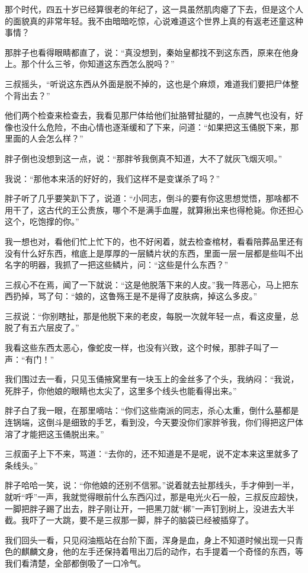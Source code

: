 那个时代，四五十岁已经算很老的年纪了，这一具虽然肌肉瘪了下去，但是这个人的面貌真的非常年轻。我不由暗暗吃惊，心说难道这个世界上真的有返老还童这种事情？

那胖子也看得眼睛都直了，说：“真没想到，秦始皇都找不到这东西，原来在他身上。那个什么三爷，你知道这东西怎么脱吗？”

三叔摇头，“听说这东西从外面是脱不掉的，这也是个麻烦，难道我们要把尸体整个背出去？”

他们两个检查来检查去，我看见那尸体给他们扯胳臂扯腿的，一点脾气也没有，好像也没什么危险，不由心情也逐渐缓和了下来，问道：“如果把这玉俑脱下来，那里面的人会怎么样？”

胖子倒也没想到这一点，说：“那胖爷我倒真不知道，大不了就灰飞烟灭呗。”

我说：“那他本来活的好好的，我们这样不是变谋杀了吗？”

胖子听了几乎要笑趴下了，说道：“小同志，倒斗的要有你这思想觉悟，那啥都不用干了，这古代的王公贵族，哪个不是满手血腥，就算揪出来也得枪毙。你还担心这个，吃饱撑的你。”

我一想也对，看他们忙上忙下的，也不好闲着，就去检查棺材，看看陪葬品里还有没有什么好东西，棺底上是厚厚的一层鳞片状的东西，里面一层一层都是些叫不出名字的明器，我抓了一把这些鳞片，问：“这些是什么东西？”

三叔心不在焉，闻了一下就说：“这是他脱落下来的人皮。”我一阵恶心，马上把东西扔掉，骂了句：“娘的，这鲁殇王是不是得了皮肤病，掉这么多皮。”

三叔说：“你别瞎扯，那是他脱下来的老皮，每脱一次就年轻一点，看这皮量，总脱了有五六层皮了。”

我看这些东西太恶心，像蛇皮一样，也没有兴致，这个时候，那胖子叫了一声：“有门！”

我们围过去一看，只见玉俑掖窝里有一块玉上的金丝多了个头，我纳闷：“我说，死胖子，你他娘的眼睛也太尖了，这里多个线头也能看得出来。”

胖子白了我一眼，在那里嘀咕：“你们这些南派的同志，杀心太重，倒什么墓都是连锅端，这倒斗是细致的手艺，看到没，今天要没你们家胖爷我，你们得把这尸体溶了才能把这玉俑脱出来。”

三叔面子上下不来，骂道：“去你的，还不知道是不是呢，说不定本来这里就多了条线头。”

胖子哈哈一笑，说：“你他娘的还别不信邪。”说着就去扯那线头，手才伸到一半，就听“呼”一声，我就觉得眼前什么东西闪过，那是电光火石一般，三叔反应超快，一脚把胖子踢了出去，胖子刚让开，一把黑刀就“梆”一声钉到树上，没进去大半截。我吓了一大跳，要不是三叔那一脚，胖子的脑袋已经被插穿了。

我们回头一看，只见闷油瓶站在台阶下面，浑身是血，身上不知道时候出现一只青色的麒麟文身，他的左手还保持着甩出刀后的动作，右手提着一个奇怪的东西，等我们看清楚，全部都倒吸了一口冷气。

